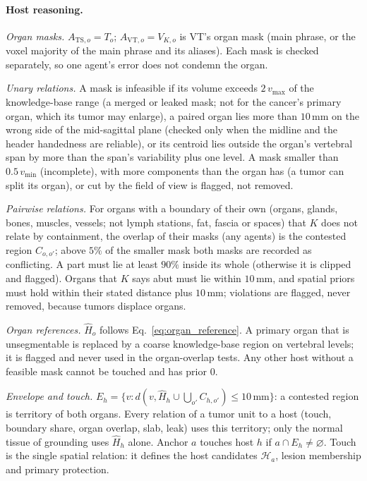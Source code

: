 \documentclass[fleqn,10pt]{olplainarticle}
\begin{document}
\paragraph{Host reasoning.}
\label{sec:host_details}
\emph{Organ masks.} $A_{\mathrm{TS},o}=T_o$; $A_{\mathrm{VT},o}=V_{K,o}$ is VT's organ mask (main phrase, or the voxel
majority of the main phrase and its aliases). Each mask is checked separately, so one agent's error does not condemn the organ.

\emph{Unary relations.} A mask is infeasible if its volume exceeds $2\,v_{\max}$ of the knowledge-base range (a merged or
leaked mask; not for the cancer's primary organ, which its tumor may enlarge), a paired organ lies more than $10$\,mm on the
wrong side of the mid-sagittal plane (checked only when the midline and the header handedness are reliable), or its centroid
lies outside the organ's vertebral span by more than the span's variability plus one level. A mask smaller than
$0.5\,v_{\min}$ (incomplete), with more components than the organ has (a tumor can split its organ), or cut by the field of
view is flagged, not removed.

\emph{Pairwise relations.} For organs with a boundary of their own (organs, glands, bones, muscles, vessels; not lymph
stations, fat, fascia or spaces) that $K$ does not relate by containment, the overlap of their masks (any agents) is the
contested region $C_{o,o'}$; above $5\%$ of the smaller mask both masks are recorded as conflicting. A part must lie at least
$90\%$ inside its whole (otherwise it is clipped and flagged). Organs that $K$ says abut must lie within $10$\,mm, and spatial
priors must hold within their stated distance plus $10$\,mm; violations are flagged, never removed, because tumors displace
organs.

\emph{Organ references.} $\hat H_o$ follows Eq.~\eqref{eq:organ_reference}. A primary organ that is unsegmentable is replaced
by a coarse knowledge-base region on vertebral levels; it is flagged and never used in the organ-overlap tests. Any other
host without a feasible mask cannot be touched and has prior $0$.

\emph{Envelope and touch.} $E_h=\{v:d(v,\hat H_h\cup\textstyle\bigcup_{o'}C_{h,o'})\le10\,\mathrm{mm}\}$: a contested region is
territory of both organs. Every relation of a tumor unit to a host (touch, boundary share, organ overlap, slab, leak) uses
this territory; only the normal tissue of grounding uses $\hat H_h$ alone. Anchor $a$ touches host $h$ if $a\cap E_h\neq\varnothing$.
Touch is the single spatial relation: it defines the host candidates $\mathcal{H}_a$, lesion membership and primary protection.
\end{document}

